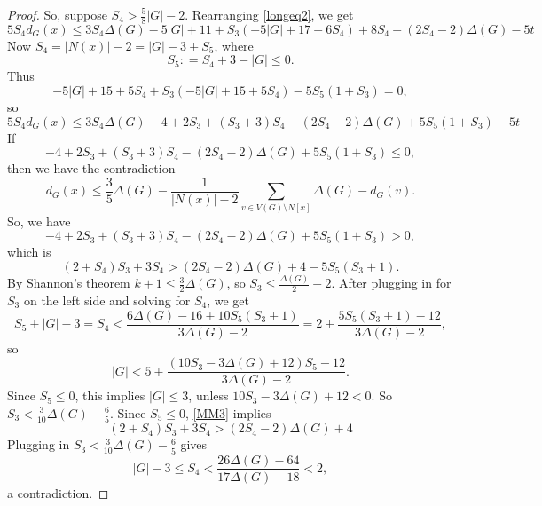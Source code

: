 \documentclass[12pt]{amsart}
\theoremstyle{plain}
\theoremstyle{definition}
\theoremstyle{remark}
\newcommand{\card}[1]{\left|#1\right|}
\newcommand{\DefinedAs}{\mathrel{\mathop:}=}
\begin{document}
\begin{proof}
So, suppose $S_4 > \frac58\card{G} - 2$. Rearranging \eqref{longeq2}, we get
\begin{equation}\label{longeq3}
5S_4d_G(x) \le 3S_4\Delta(G) - 5|G| + 11 + S_3(-5|G| + 17 + 6S_4) + 8S_4 - (2S_4-2)\Delta(G) - 5t
\end{equation}
Now $S_4 = \card{N(x)} - 2 = \card{G} - 3 + S_5$, where
\[S_5 \DefinedAs S_4 + 3 - \card{G} \le 0.\]
Thus
\[-5|G| + 15 + 5S_4 +S_3(-5|G| + 15 + 5S_4) - 5S_5(1 + S_3) = 0,\]
so
\begin{equation}\label{longeq4}
5S_4d_G(x) \le 3S_4\Delta(G) - 4 + 2S_3 + (S_3 + 3)S_4 - (2S_4-2)\Delta(G) + 5S_5(1 + S_3) - 5t 
\end{equation}
If
\[-4 + 2S_3 + (S_3 + 3)S_4 - (2S_4-2)\Delta(G) + 5S_5(1 + S_3) \le 0,\]
then we have the contradiction
\[d_G(x) \le \frac{3}{5}\Delta(G) - \frac{1}{\card{N(x)} - 2}\sum_{v \in V(G)\setminus N[x]} \Delta(G) - d_G(v).\]
So, we have
\[-4 + 2S_3 + (S_3 + 3)S_4 - (2S_4-2)\Delta(G) + 5S_5(1 + S_3) > 0,\]
which is
\begin{equation}\label{MM3}
(2 + S_4)S_3 + 3S_4 > (2S_4-2)\Delta(G) + 4 - 5S_5(S_3 + 1).
\end{equation}
By Shannon's theorem $k + 1 \le \frac32\Delta(G)$, so $S_3 \le \frac{\Delta(G)}{2} - 2$. After plugging in for $S_3$ on the left side and solving for $S_4$, we get
\[S_5 + \card{G} - 3 = S_4 < \frac{6\Delta(G) - 16 + 10S_5(S_3+1)}{3\Delta(G) - 2} = 2 + \frac{5S_5(S_3 + 1) - 12}{3\Delta(G) - 2},\]
so
\[\card{G} < 5 + \frac{(10S_3 - 3\Delta(G) + 12)S_5 - 12}{3\Delta(G) - 2}.\]
Since $S_5 \le 0$, this implies $\card{G} \le 3$, unless $10S_3 - 3\Delta(G) + 12 < 0$.  So $S_3 < \frac{3}{10}\Delta(G) - \frac65$. 
Since $S_5 \le 0$, \eqref{MM3} implies
\[(2 + S_4)S_3 + 3S_4 > (2S_4-2)\Delta(G) + 4\]
Plugging in $S_3 < \frac{3}{10}\Delta(G)-\frac65$ gives
\[\card{G} - 3 \le S_4 < \frac{26\Delta(G) - 64}{17\Delta(G) - 18} < 2,\]
a contradiction.
\end{proof}
\end{document}
